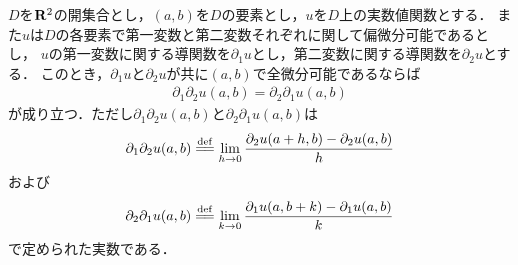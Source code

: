 	\begin{screen}
		\begin{thm}[偏導関数が全微分可能なら偏微分は順序を替えても等しい]
			$D$を$\mathbf{R}^2$の開集合とし，$(a,b)$を$D$の要素とし，$u$を$D$上の実数値関数とする．
			また$u$は$D$の各要素で第一変数と第二変数それぞれに関して偏微分可能であるとし，
			$u$の第一変数に関する導関数を$\partial_1 u$とし，第二変数に関する導関数を$\partial_2 u$とする．
			このとき，$\partial_1 u$と$\partial_2 u$が共に$(a,b)$で全微分可能であるならば
			\begin{align}
				\partial_1 \partial_2 u(a,b) = \partial_2 \partial_1 u(a,b)
			\end{align}
			が成り立つ．ただし$\partial_1 \partial_2 u(a,b)$と$\partial_2 \partial_1 u(a,b)$は
			\begin{align}
				\partial_1 \partial_2 u(a,b) \defeq \lim_{h \to 0} \frac{\partial_2 u(a+h,b) - \partial_2 u(a,b)}{h}
			\end{align}
			および
			\begin{align}
				\partial_2 \partial_1 u(a,b) \defeq \lim_{k \to 0} \frac{\partial_1 u(a,b+k) - \partial_1 u(a,b)}{k}
			\end{align}
			で定められた実数である．
		\end{thm}
	\end{screen}
	

